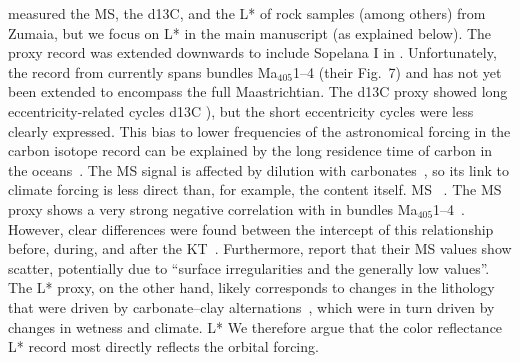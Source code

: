 \documentclass[]{agujournal2019}
\newcommand{\ma}[1]{Ma\(_{405}\)#1} %
\begin{document}
 measured the \gls{MS}, the \gls{d13C}, and the \acrfull{L*} of rock samples (among others) from Zumaia, but we focus on \gls{L*} in the main manuscript (as explained below).
The  proxy record was extended downwards to include Sopelana I in .
Unfortunately, the  record from  currently spans bundles \ma{1--4} (their Fig.~7) and has not yet been extended to encompass the full Maastrichtian.
The \gls{d13C} proxy showed long eccentricity-related cycles  \gls{d13C} ), but the short eccentricity cycles were less clearly expressed.
This bias to lower frequencies of the astronomical forcing in the carbon isotope record can be explained by the long residence time of carbon in the oceans~\cite{Zeebe2017,Kocken2019loscar}.
The \gls{MS} signal is affected by dilution with carbonates~\cite{tenKateSprenger1993},
so its link to climate forcing is less direct than, for example, the  content itself.
 \gls{MS} ~\cite{Batenburg2012}.
The \gls{MS} proxy shows a very strong negative correlation with  in bundles \ma{1--4}~\cite{tenKateSprenger1993,Gilabert2022}.
However, clear differences were found between the intercept of this relationship before, during, and after the \gls{KT}~\cite<supplementary figure S2 in>{Gilabert2022}.
Furthermore,  report that their \gls{MS} values show scatter, potentially due to ``surface irregularities and the generally low values''.
The \gls{L*} proxy, on the other hand, likely corresponds to changes in the lithology that were driven by carbonate--clay alternations~\cite{MountWard1986,Batenburg2012},
which were in turn driven by changes in wetness and climate.
 \gls{L*} 
We therefore argue that the color reflectance \gls{L*} record most directly reflects the  orbital forcing.
\end{document}
